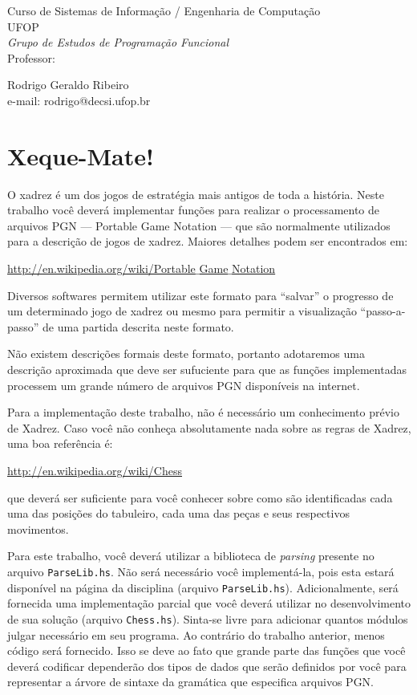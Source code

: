 \documentclass[11pt,a4paper]{article}
\begin{document}
\noindent Curso de Sistemas de Informa\c{c}\~ao / Engenharia de Computa\c{c}\~ao\\
UFOP \\
{\it Grupo de Estudos de Programa\c{c}\~ao Funcional}\\
Professor: \parbox[t]{14cm}{Rodrigo Geraldo Ribeiro \\
                     e-mail: rodrigo@decsi.ufop.br}
  

\section{Xeque-Mate!}

O xadrez \'e um dos jogos de estrat\'egia mais antigos de toda a hist\'oria.
Neste trabalho voc\^e dever\'a implementar fun\c{c}\~oes para realizar o 
processamento de arquivos PGN --- Portable Game Notation --- que s\~ao normalmente 
utilizados para a descri\c{c}\~ao de jogos de xadrez. Maiores detalhes podem 
ser encontrados em:
\begin{center}
	\href{http://en.wikipedia.org/wiki/Portable_Game_Notation}{http://en.wikipedia.org/wiki/Portable$\_$Game$\_$Notation}
\end{center}
Diversos softwares permitem utilizar este formato para ``salvar'' o progresso
de um determinado jogo de xadrez ou mesmo para permitir a visualiza\c{c}\~ao
``passo-a-passo'' de uma partida descrita neste formato.

N\~ao existem descri\c{c}\~oes formais deste formato, portanto adotaremos 
uma descri\c{c}\~ao aproximada que deve ser sufuciente para que as 
fun\c{c}\~oes implementadas processem um grande n\'umero de arquivos PGN
dispon\'iveis na internet.

Para a implementa\c{c}\~ao deste trabalho, n\~ao \'e necess\'ario um 
conhecimento pr\'evio de Xadrez. Caso voc\^e n\~ao conhe\c{c}a 
absolutamente nada sobre as regras de Xadrez, uma boa refer\^encia \'e:
\begin{center}
	\href{http://en.wikipedia.org/wiki/Chess}{http://en.wikipedia.org/wiki/Chess}
\end{center}
que dever\'a ser suficiente para voc\^e conhecer sobre como s\~ao 
identificadas cada uma das posi\c{c}\~oes do tabuleiro, cada uma das pe\c{c}as
e seus respectivos movimentos. 

Para este trabalho, voc\^e dever\'a utilizar a biblioteca de \emph{parsing}
presente no arquivo \texttt{ParseLib.hs}. N\~ao ser\'a necess\'ario voc\^e
implement\'a-la, pois esta estar\'a dispon\'ivel na p\'agina da disciplina 
(arquivo \texttt{ParseLib.hs}). Adicionalmente, ser\'a fornecida uma 
implementa\c{c}\~ao parcial que voc\^e dever\'a utilizar no desenvolvimento
de sua solu\c{c}\~ao (arquivo \texttt{Chess.hs}). Sinta-se livre para 
adicionar quantos m\'odulos julgar necess\'ario em seu programa. 
Ao contr\'ario do trabalho anterior, menos c\'odigo ser\'a fornecido. Isso
se deve ao fato que grande parte das fun\c{c}\~oes que voc\^e dever\'a 
codificar depender\~ao dos tipos de dados que ser\~ao definidos por voc\^e
para representar a \'arvore de sintaxe da gram\'atica que especifica 
arquivos PGN. 
\end{document}
